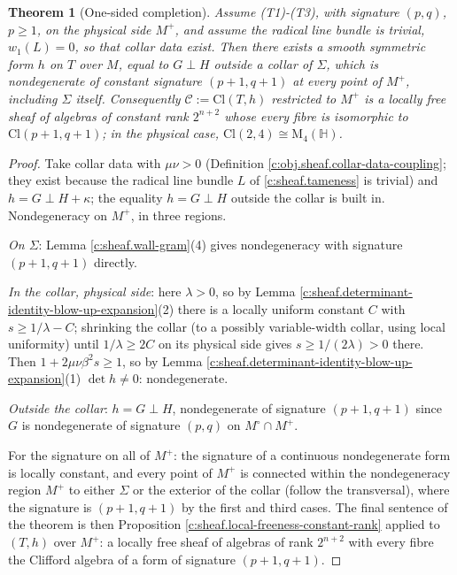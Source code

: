 \documentclass[11pt]{article}
\newtheorem{theorem}{Theorem}[section]
\theoremstyle{definition}
\theoremstyle{plain}
\providecommand{\Cl}{}\renewcommand{\Cl}{\mathrm{Cl}}
\providecommand{\HH}{}\renewcommand{\HH}{\mathbb{H}}
\providecommand{\Mat}{}\renewcommand{\Mat}{\mathrm{M}}
\providecommand{\Mo}{}\renewcommand{\Mo}{M^{\circ}}
\providecommand{\Mp}{}\renewcommand{\Mp}{M^{+}}
\providecommand{\Sig}{}\renewcommand{\Sig}{\Sigma}
\providecommand{\shC}{}\renewcommand{\shC}{\mathcal{C}}
\providecommand{\shL}{}\renewcommand{\shL}{L}
\begin{document}
\begin{theorem}[One-sided completion]\label{c:sheaf.one-sided-completion}
Assume (T1)-(T3), with signature $(p,q)$, $p \geq 1$, on the physical side $\Mp$, and assume the radical line bundle is trivial, $w_1(\shL) = 0$, so that collar data exist. Then there exists a smooth symmetric form $h$ on $T$ over $M$, equal to $G \perp H$ outside a collar of $\Sig$, which is nondegenerate of constant signature $(p{+}1, q{+}1)$ at every point of $\Mp$, including $\Sig$ itself. Consequently $\shC := \Cl(T, h)$ restricted to $\Mp$ is a locally free sheaf of algebras of constant rank $2^{n+2}$ whose every fibre is isomorphic to $\Cl(p{+}1, q{+}1)$; in the physical case, $\Cl(2,4) \cong \Mat_4(\HH)$.
\end{theorem}
\begin{proof}
Take collar data with $\mu\nu > 0$ (Definition \ref{c:obj.sheaf.collar-data-coupling}; they exist because the radical line bundle $\shL$ of \ref{c:sheaf.tameness} is trivial) and $h = G \perp H + \kappa$; the equality $h = G \perp H$ outside the collar is built in. Nondegeneracy on $\Mp$, in three regions.

\emph{On $\Sig$}: Lemma \ref{c:sheaf.wall-gram}(4) gives nondegeneracy with signature $(p{+}1, q{+}1)$ directly.

\emph{In the collar, physical side}: here $\lambda > 0$, so by Lemma \ref{c:sheaf.determinant-identity-blow-up-expansion}(2) there is a locally uniform constant $C$ with $s \geq 1/\lambda - C$; shrinking the collar (to a possibly variable-width collar, using local uniformity) until $1/\lambda \geq 2C$ on its physical side gives $s \geq 1/(2\lambda) > 0$ there. Then $1 + 2\mu\nu\beta^2 s \geq 1$, so by Lemma \ref{c:sheaf.determinant-identity-blow-up-expansion}(1) $\det h \neq 0$: nondegenerate.

\emph{Outside the collar}: $h = G \perp H$, nondegenerate of signature $(p{+}1,q{+}1)$ since $G$ is nondegenerate of signature $(p,q)$ on $\Mo \cap \Mp$.

For the signature on all of $\Mp$: the signature of a continuous nondegenerate form is locally constant, and every point of $\Mp$ is connected within the nondegeneracy region $\Mp$ to either $\Sig$ or the exterior of the collar (follow the transversal), where the signature is $(p{+}1,q{+}1)$ by the first and third cases. The final sentence of the theorem is then Proposition \ref{c:sheaf.local-freeness-constant-rank} applied to $(T, h)$ over $\Mp$: a locally free sheaf of algebras of rank $2^{n+2}$ with every fibre the Clifford algebra of a form of signature $(p{+}1, q{+}1)$.

\end{proof}
\end{document}
